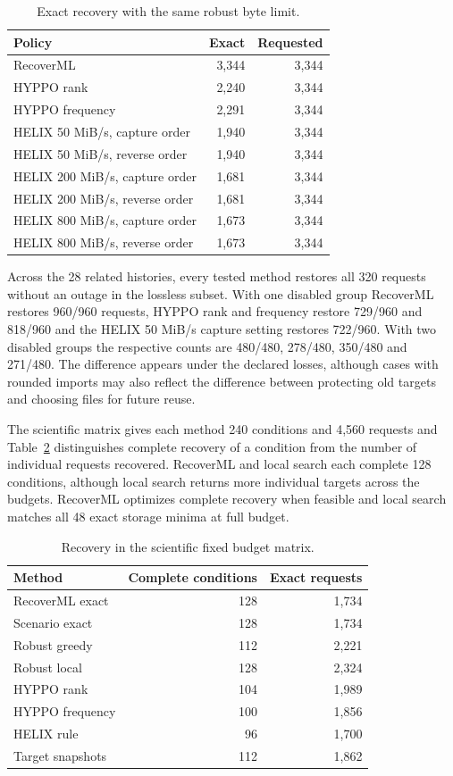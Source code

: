 \begin{table}[t]
\caption{Exact recovery with the same robust byte limit.}
\label{tab:published}
\centering\small
\begin{tabular}{lrr}
\toprule
Policy & Exact & Requested\\
\midrule
RecoverML & 3,344 & 3,344\\
HYPPO rank & 2,240 & 3,344\\
HYPPO frequency & 2,291 & 3,344\\
HELIX 50 MiB/s, capture order & 1,940 & 3,344\\
HELIX 50 MiB/s, reverse order & 1,940 & 3,344\\
HELIX 200 MiB/s, capture order & 1,681 & 3,344\\
HELIX 200 MiB/s, reverse order & 1,681 & 3,344\\
HELIX 800 MiB/s, capture order & 1,673 & 3,344\\
HELIX 800 MiB/s, reverse order & 1,673 & 3,344\\
\bottomrule
\end{tabular}
\end{table}

Across the 28 related histories, every tested method restores all 320 requests without an outage in the lossless subset. With one disabled group RecoverML restores 960/960 requests, HYPPO rank and frequency restore 729/960 and 818/960 and the HELIX 50 MiB/s capture setting restores 722/960. With two disabled groups the respective counts are 480/480, 278/480, 350/480 and 271/480. The difference appears under the declared losses, although cases with rounded imports may also reflect the difference between protecting old targets and choosing files for future reuse.

The scientific matrix gives each method 240 conditions and 4,560 requests and Table~\ref{tab:scientific} distinguishes complete recovery of a condition from the number of individual requests recovered. RecoverML and local search each complete 128 conditions, although local search returns more individual targets across the budgets. RecoverML optimizes complete recovery when feasible and local search matches all 48 exact storage minima at full budget.

\begin{table}[t]
\centering\small
\caption{Recovery in the scientific fixed budget matrix.}
\label{tab:scientific}
\begin{tabular}{lrr}
\toprule
Method & Complete conditions & Exact requests\\
\midrule
RecoverML exact & 128 & 1,734\\
Scenario exact & 128 & 1,734\\
Robust greedy & 112 & 2,221\\
Robust local & 128 & 2,324\\
HYPPO rank & 104 & 1,989\\
HYPPO frequency & 100 & 1,856\\
HELIX rule & 96 & 1,700\\
Target snapshots & 112 & 1,862\\
\bottomrule
\end{tabular}
\end{table}

